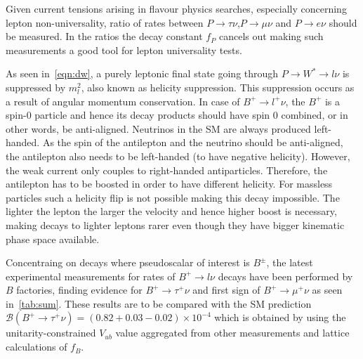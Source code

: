 Given current tensions arising in flavour physics searches, especially concerning lepton non-universality, ratio of rates between $P\rightarrow\tau\nu$,$P\rightarrow\mu\nu$ and $P\rightarrow e\nu$ should be measured. In the ratios the decay constant $f_{P}$ cancels out making such measurements a good tool for lepton universality tests.

As seen in~\autoref{eqn:dw}, a purely leptonic final state going through $P\rightarrow W^{*}\rightarrow l \nu$ is suppressed by $m^{2}_{l}$, also known as helicity suppression. This suppression occurs as a result of angular momentum conservation. In case of $B^{+}\rightarrow l^{+} \nu$, the $B^{+}$ is a spin-0 particle and hence its decay products should have spin 0 combined, or in other words, be anti-aligned. Neutrinos in the \gls{SM} are always produced left-handed. As the spin of the antilepton and the neutrino should be anti-aligned, the antilepton also needs to be left-handed (to have negative helicity). However, the weak current only couples to right-handed antiparticles. Therefore, the antilepton has to be boosted in order to have different helicity. For massless particles such a helicity flip is not possible making this decay impossible. The lighter the lepton the larger the velocity and hence higher boost is necessary, making decays to lighter leptons rarer even though they have bigger kinematic phase space available.

Concentraing on decays where pseudoscalar of interest is $B^{\pm}$, the latest experimental measurements for rates of $B^{+}\rightarrow l \nu$ decays have been performed by $B$ factories, finding evidence for $B^{+}\rightarrow \tau^{+}\nu$ and first sign of $B^{+}\rightarrow \mu^{+}\nu$ as seen in~\autoref{tab:sum}. These results are to be compared with the \gls{SM} prediction $\mathcal{B}(B^{+}\rightarrow \tau^{+}\nu) = (0.82+0.03-0.02)\times10^{-4}$\cite{Charles:2004jd} which is obtained by using the unitarity-constrained $V_{ub}$ value aggregated from other measurements and lattice calculations of $f_{B}$. %

